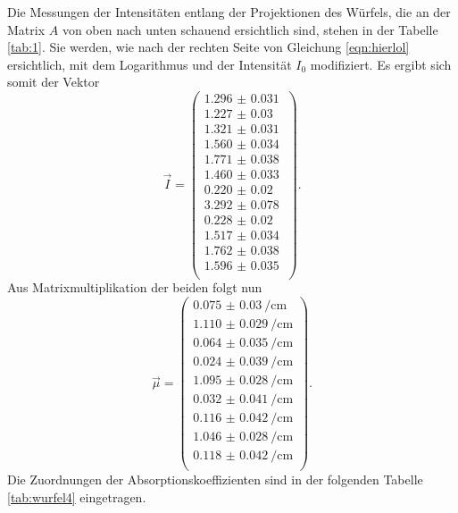 Die Messungen der Intensitäten entlang der Projektionen des Würfels, die an der Matrix $A$ von oben nach unten schauend ersichtlich sind, stehen in der Tabelle \ref{tab:1}. 
Sie werden, wie nach der rechten Seite von Gleichung \eqref{eqn:hierlol} ersichtlich, mit dem Logarithmus und der Intensität $I_0$ modifiziert. Es ergibt sich somit der Vektor
\begin{equation*}
\vec{I} = 
\begin{pmatrix}
    \SI{1.296(31)}{} \\ 
    \SI{1.227(30)}{} \\ 
    \SI{1.321(31)}{} \\ 
    \SI{1.560(34)}{} \\ 
    \SI{1.771(38)}{} \\ 
    \SI{1.460(33)}{} \\ 
    \SI{0.220(20)}{} \\ 
    \SI{3.292(78)}{} \\ 
    \SI{0.228(20)}{} \\ 
    \SI{1.517(34)}{} \\ 
    \SI{1.762(38)}{} \\ 
    \SI{1.596(35)}{} \\ 
\end{pmatrix}.
\end{equation*}
Aus Matrixmultiplikation der beiden folgt nun 
\begin{equation*}
\vec{\mu} = 
\begin{pmatrix}
    \SI{0.075(30)}{\per\centi\meter} \\ 
    \SI{1.110(29)}{\per\centi\meter} \\ 
    \SI{0.064(35)}{\per\centi\meter} \\ 
    \SI{0.024(39)}{\per\centi\meter} \\ 
    \SI{1.095(28)}{\per\centi\meter} \\ 
    \SI{0.032(41)}{\per\centi\meter} \\ 
    \SI{0.116(42)}{\per\centi\meter} \\ 
    \SI{1.046(28)}{\per\centi\meter} \\ 
    \SI{0.118(42)}{\per\centi\meter} \\ 
\end{pmatrix}.
\end{equation*}
Die Zuordnungen der Absorptionskoeffizienten sind in der folgenden Tabelle \ref{tab:wurfel4} eingetragen.
